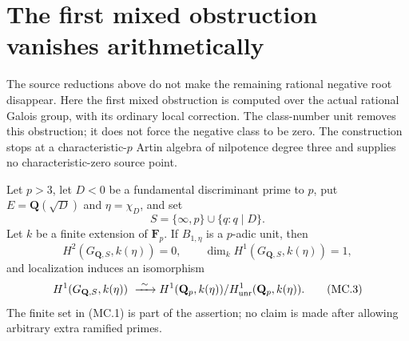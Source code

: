 \section{The first mixed obstruction vanishes arithmetically}
\label{sec:kt-global-mixed-cup}

The source reductions above do not make the remaining rational
negative root disappear.  Here the first mixed obstruction is
computed over the actual rational Galois group, with its ordinary
local correction.  The class-number unit removes this obstruction;
it does not force the negative class to be zero.  The construction
stops at a characteristic-$p$ Artin algebra of nilpotence degree
three and supplies no characteristic-zero source point.

\begin{lemma}
Let $p>3$, let $D<0$ be a fundamental discriminant prime to $p$,
put $E=\mathbf Q(\sqrt D)$ and $\eta=\chi_D$, and set
\[
                  S=\{\infty,p\}\cup\{q:q\mid D\}.
                                                               \tag{MC.1}
\]
Let $k$ be a finite extension of $\mathbf F_p$.
If $B_{1,\eta}$ is a $p$-adic unit, then
\[
 H^2(G_{\mathbf Q,S},k(\eta))=0,\qquad
 \dim_k H^1(G_{\mathbf Q,S},k(\eta))=1,                  \tag{MC.2}
\]
and localization induces an isomorphism
\[
 H^1(G_{\mathbf Q,S},k(\eta))
       \ \xrightarrow{\ \sim\ }
 H^1(\mathbf Q_p,k(\eta))/H^1_{\rm unr}(\mathbf Q_p,k(\eta)).
                                                               \tag{MC.3}
\]
The finite set in (MC.1) is part of the assertion; no claim is
made after allowing arbitrary extra ramified primes.
\end{lemma}

